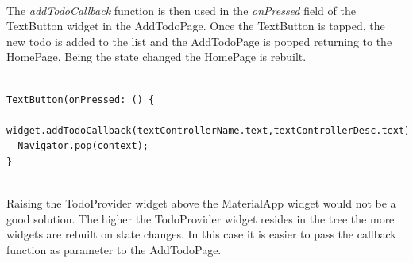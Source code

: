 \mbox{}\\
The \textit{addTodoCallback} function is then used in the \textit{onPressed} field of the TextButton widget in the AddTodoPage. Once the TextButton is tapped, the new todo is added to the list and the AddTodoPage is popped returning to the HomePage. Being the state changed the HomePage is rebuilt.
\mbox{}\\
\mbox{}
\begin{code}
\label{code:2.36}
\begin{verbatim}

TextButton(onPressed: () {
  widget.addTodoCallback(textControllerName.text,textControllerDesc.text);
  Navigator.pop(context);
}
\end{verbatim}
\end{code}
\mbox{}\\
Raising the TodoProvider widget above the MaterialApp widget would not be a good solution. The higher the TodoProvider widget resides in the tree the more widgets are rebuilt on state changes. In this case it is easier to pass the callback function as parameter to the AddTodoPage.


